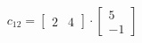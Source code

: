 \documentclass[preview]{standalone}
\begin{document}
\begin{align*}
c_{12} = \begin{bmatrix} 2 & 4 \end{bmatrix} \cdot \begin{bmatrix} 5 \\ -1 \end{bmatrix}
\end{align*}
\end{document}
